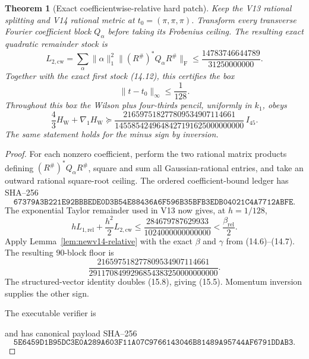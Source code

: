 \documentclass[11pt,oneside]{article}
\newtheorem{theorem}{Theorem}[section]
\theoremstyle{definition}
\theoremstyle{remark}
\begin{document}
\begin{theorem}[Exact coefficientwise-relative hard patch]
\label{thm:newv15-coefficientwise}
Keep the V13 rational splitting and V14 rational metric at
\(t_0=(\pi,\pi,\pi)\).  Transform every transverse Fourier
coefficient block \(Q_\alpha\) before taking its Frobenius ceiling.
The resulting exact quadratic remainder stock is
\[
 L_{2,\mathrm{cw}}
 =\sum_\alpha\|\alpha\|_1^2
 \|(R^\#)^*Q_\alpha R^\#\|_{\mathrm F}
 \le\frac{14783746644789}{31250000000}.                   \tag{15.3}
\]
Together with the exact first stock (14.12), this certifies the box
\[
 \|t-t_0\|_\infty\le\frac1{128}.                          \tag{15.4}
\]
Throughout this box the Wilson plus four-thirds pencil, uniformly in
\(k_1\), obeys
\[
 \frac43H_{\mathrm W}+\nabla_1H_{\mathrm W}
 \succeq
 \frac{216597518277809534907114661}
 {1455854249648427191625000000000}\,I_{45}.              \tag{15.5}
\]
The same statement holds for the minus sign by inversion.
\end{theorem}

\begin{proof}
For each nonzero coefficient, perform the two rational matrix
products defining \((R^\#)^*Q_\alpha R^\#\), square and sum all
Gaussian-rational entries, and take an outward rational square-root
ceiling.  The ordered coefficient-bound ledger has SHA--256
\[
\texttt{67379A3B221E92BBBEDE0D3B54E88436A6F596B35BFB3EDB04021C4A7712ABFE}.
                                                               \tag{15.6}
\]
The exponential Taylor remainder used in V13 now gives, at
\(h=1/128\),
\[
 hL_{1,\mathrm{rel}}+\frac{h^2}{2}L_{2,\mathrm{cw}}
 \le\frac{284679787629933}{1024000000000000}
 <\frac{\beta_{\mathrm{rel}}}{2}.                         \tag{15.7}
\]
Apply Lemma~\ref{lem:newv14-relative} with the exact \(\beta\) and
\(\gamma\) from (14.6)--(14.7).  The resulting \(90\)-block floor is
\[
 \frac{216597518277809534907114661}
 {2911708499296854383250000000000}.                       \tag{15.8}
\]
The structured-vector identity doubles (15.8), giving (15.5).
Momentum inversion supplies the other sign.

The executable verifier is
\begin{center}
\footnotesize
{}
\end{center}
and has canonical payload SHA--256
\[
\texttt{5E6459D1B95DC3E0A289A603F11A07C9766143046B81489A95744AF6791DDAB3}.
                                                               \tag{15.9}
\]
\end{proof}
\end{document}

